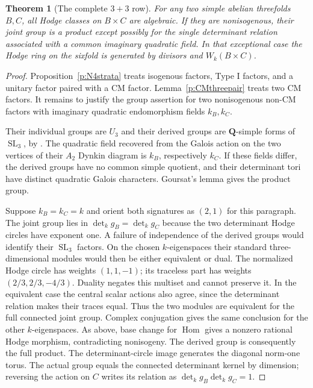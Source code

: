 \documentclass[11pt,reqno]{article}
\theoremstyle{emphasizedplain}
\newtheorem{theorem}{Theorem}[section]
\theoremstyle{emphasizeddefinition}
\theoremstyle{emphasizeddefinition}
\DeclareMathOperator{\Hom}{Hom}
\DeclareMathOperator{\SL}{SL}
\newcommand{\Q}{\mathbf Q}
\begin{document}
\begin{theorem}[The complete $3+3$ row]\label{p:N4complete}
For any two simple abelian threefolds $B,C$, all Hodge classes on
$B\times C$ are algebraic. If they are nonisogenous, their joint group
is a product except possibly for the single determinant relation
associated with a common imaginary quadratic field. In that exceptional
case the Hodge ring on the sixfold is generated by divisors and
$W_k(B\times C)$.
\end{theorem}
\begin{proof}
Proposition~\ref{p:N4strata} treats isogenous factors, Type I factors,
and a unitary factor paired with a CM factor. Lemma~\ref{p:CMthreepair}
treats two CM factors. It remains to justify the group assertion for
two nonisogenous non-CM factors with imaginary quadratic endomorphism
fields $k_B,k_C$.

Their individual groups are $U_3$ and their derived groups are
$\Q$-simple forms of $\SL_3$, by \cite[\S2.3]{MZ}.
The quadratic field recovered from the Galois action on the two
vertices of their $A_2$ Dynkin diagram is $k_B$, respectively $k_C$.
If these fields differ, the derived groups have no common simple
quotient, and their determinant tori have distinct quadratic Galois
characters. Goursat's lemma gives the product group.

Suppose $k_B=k_C=k$ and orient both signatures as $(2,1)$ for this
paragraph. The joint group lies in $\det_k g_B=\det_k g_C$ because
the two determinant Hodge circles have exponent one. A failure of
independence of the derived groups would identify their $\SL_3$
factors. On the chosen $k$-eigenspaces their standard three-dimensional
modules would then be either equivalent or dual. The normalized Hodge
circle has weights $(1,1,-1)$; its traceless part has weights
$(2/3,2/3,-4/3)$. Duality negates this multiset and cannot preserve it.
In the equivalent case the central scalar actions also agree, since
the determinant relation makes their traces equal. Thus the two
modules are equivalent for the full connected joint group. Complex
conjugation gives the same conclusion for the other $k$-eigenspaces.
As above, base change for $\Hom$ gives a nonzero rational Hodge
morphism, contradicting nonisogeny. The derived group is consequently
the full product. The determinant-circle image generates the diagonal
norm-one torus. The actual group equals the connected determinant
kernel by dimension; reversing the action on $C$ writes its relation
as $\det_k g_B\det_k g_C=1$.


\end{proof}
\end{document}
